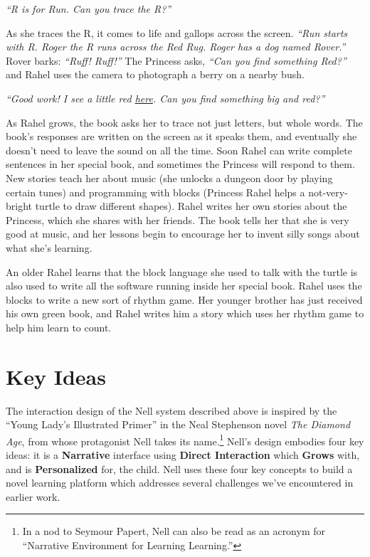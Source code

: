 \documentclass[preprint]{sig-alternate}
\begin{document}
\textit{``R is for Run.  Can you trace the R?''}

As she traces the R, it comes to life and gallops across the screen.
\textit{``Run starts with R.  Roger the R runs across the Red Rug.
Roger has a dog named Rover.''}  Rover barks: \textit{``Ruff! Ruff!''}  The
Princess asks, \textit{``Can you find something Red?''} and Rahel uses the
camera to photograph a berry on a nearby bush.

\emph{``Good work!  I see a little red \underline{here}.  Can you find
something \emph{big} and red?''}

As Rahel grows, the book asks her to trace not just letters, but whole
words.  The book's responses are written on the screen as it speaks
them, and eventually she doesn't need to leave the sound on all the
time.  Soon Rahel can write complete sentences in her special book,
and sometimes the Princess will respond to them.  New stories teach her about
music (she unlocks a dungeon door by playing certain tunes) and
programming with blocks (Princess Rahel helps a not-very-bright turtle
to draw different shapes).  Rahel writes her own stories about the Princess,
which she shares with her friends.  The book tells her that she is
very good at music, and her lessons begin to encourage her to invent
silly songs about what she's learning.

An older Rahel learns that the block language she used to talk with
the turtle is also used to write all the software running inside
her special book.  Rahel uses the blocks to write a new sort of rhythm
game.  Her younger brother has just received his own green book,
and Rahel writes him a story which uses her rhythm game to help him learn
to count.

\section{Key Ideas}
The interaction design of the Nell system described above is inspired
by the ``Young Lady's Illustrated Primer'' in the Neal Stephenson
novel \textit{The Diamond Age}, from whose protagonist Nell takes its
name.\footnote{In a nod to Seymour Papert, Nell can also be read as an
acronym for ``Narrative Environment for Learning Learning.''}
Nell's design embodies four key ideas: it is a \textbf{Narrative}
interface using \textbf{Direct Interaction} which \textbf{Grows} with,
and is \textbf{Personalized} for, the child.
Nell uses these four key concepts to build a novel learning platform
which addresses several challenges we've encountered in earlier work.
\end{document}
